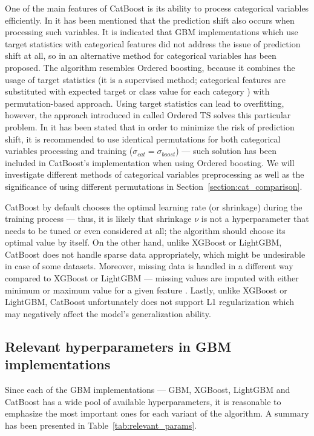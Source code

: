 \documentclass[magisterska, english]{pwr_wmat_praca_dyplomowa}
\theoremstyle{plain}
\numberwithin{theorem}{chapter}
\theoremstyle{definition}
\numberwithin{theorem}{chapter}
\begin{document}
One of the main features of CatBoost is its ability to process categorical variables efficiently. In \cite{catboost} it has been mentioned that the prediction shift also occurs when processing such variables. It is indicated that GBM implementations which use target statistics with categorical features did not address the issue of prediction shift at all, so in \cite{catboost} an alternative method for categorical variables has been proposed. The algorithm resembles Ordered boosting, because it combines the usage of target statistics (it is a supervised method; categorical features are substituted with expected target or class value for each category \cite{comparative_analysis}) with permutation-based approach. Using target statistics can lead to overfitting, however, the approach introduced in \cite{catboost} called Ordered TS solves this particular problem. In \cite{catboost} it has been stated that in order to minimize the risk of prediction shift, it is recommended to use identical permutations for both categorical variables processing and training ($\sigma_{cat} = \sigma_{boost}$) --- such solution has been included in CatBoost's implementation when using Ordered boosting. We will investigate different methods of categorical variables preprocessing as well as the significance of using different permutations in Section~\ref{section:cat_comparison}.

CatBoost by default chooses the optimal learning rate (or shrinkage) during the training process --- thus, it is likely that shrinkage $\nu$ is not a hyperparameter that needs to be tuned or even considered at all; the algorithm should choose its optimal value by itself. On the other hand, unlike XGBoost or LightGBM, CatBoost does not handle sparse data appropriately, which might be undesirable in case of some datasets. Moreover, missing data is handled in a different way compared to XGBoost or LightGBM --- missing values are imputed with either minimum or maximum value for a given feature \cite{catboost}. Lastly, unlike XGBoost or LightGBM, CatBoost unfortunately does not support L1 regularization which may negatively affect the model's generalization ability.

\subsection{Relevant hyperparameters in GBM implementations}
Since each of the GBM implementations --- GBM, XGBoost, LightGBM and CatBoost has a wide pool of available hyperparameters, it is reasonable to emphasize the most important ones for each variant of the algorithm. A summary has been presented in Table~\ref{tab:relevant_params}.
\end{document}
